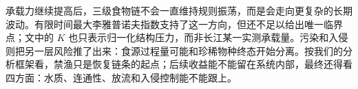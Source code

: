 承载力继续提高后，三级食物链不会一直维持规则振荡，而是会走向更复杂的长期波动。有限时间最大李雅普诺夫指数支持了这一方向，但还不足以给出唯一临界点；文中的 $K$ 也只表示归一化结构压力，而非长江某一实测承载量。污染和入侵则把另一层风险推了出来：食源过程量可能和珍稀物种终态开始分离。按我们的分析框架看，禁渔只是恢复链条的起点；后续收益能不能留在系统内部，最终还得看四方面：水质、连通性、放流和入侵控制能不能跟上。
